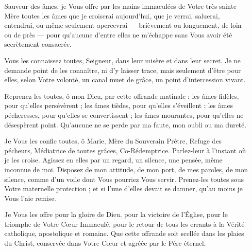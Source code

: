  Sauveur des âmes, je Vous offre par les mains immaculées de Votre très sainte Mère toutes les âmes que je croiserai aujourd’hui, que je verrai, saluerai, entendrai, ou même seulement apercevrai --- brièvement ou longuement, de loin ou de près --- pour qu’aucune d’entre elles ne m’échappe sans Vous avoir été secrètement consacrée.

Vous les connaissez toutes, Seigneur, dans leur misère et dans leur secret. Je ne demande point de les connaître, ni d’y laisser trace, mais seulement d’être pour elles, selon Votre volonté, un canal muet de grâce, un point d’intercession vivant.

Reprenez-les toutes, ô mon Dieu, par cette offrande matinale : les âmes fidèles, pour qu’elles persévèrent ; les âmes tièdes, pour qu’elles s’éveillent ; les âmes pécheresses, pour qu’elles se convertissent ; les âmes mourantes, pour qu’elles ne désespèrent point. Qu’aucune ne se perde par ma faute, mon oubli ou ma dureté.

Je Vous les confie toutes, ô Marie, Mère du Souverain Prêtre, Refuge des pécheurs, Médiatrice de toutes grâces, Co-Rédemptrice. Parlez-leur à l’instant où je les croise. Agissez en elles par un regard, un silence, une pensée, même inconnue de moi. Disposez de mon attitude, de mon port, de mes paroles, de mon silence, comme d’un voile dont Vous pourriez Vous servir. Prenez-les toutes sous Votre maternelle protection ; et si l’une d’elles devait se damner, qu’au moins je Vous l’aie remise.

Je Vous les offre pour la gloire de Dieu, pour la victoire de l’Église, pour le triomphe de Votre Cœur Immaculé, pour le retour de tous les errants à la Vérité catholique, apostolique et romaine. Que cette offrande soit scellée dans les plaies du Christ, conservée dans Votre Cœur et agréée par le Père éternel.

\culdelampe


